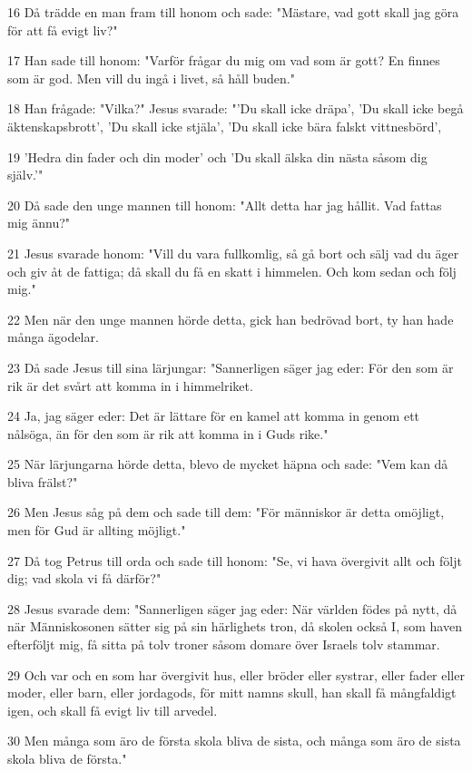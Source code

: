 \par 16 Då trädde en man fram till honom och sade: "Mästare, vad gott skall jag göra för att få evigt liv?"
\par 17 Han sade till honom: "Varför frågar du mig om vad som är gott? En finnes som är god. Men vill du ingå i livet, så håll buden."
\par 18 Han frågade: "Vilka?" Jesus svarade: "'Du skall icke dräpa', 'Du skall icke begå äktenskapsbrott', 'Du skall icke stjäla', 'Du skall icke bära falskt vittnesbörd',
\par 19 'Hedra din fader och din moder' och 'Du skall älska din nästa såsom dig själv.'"
\par 20 Då sade den unge mannen till honom: "Allt detta har jag hållit. Vad fattas mig ännu?"
\par 21 Jesus svarade honom: "Vill du vara fullkomlig, så gå bort och sälj vad du äger och giv åt de fattiga; då skall du få en skatt i himmelen. Och kom sedan och följ mig."
\par 22 Men när den unge mannen hörde detta, gick han bedrövad bort, ty han hade många ägodelar.
\par 23 Då sade Jesus till sina lärjungar: "Sannerligen säger jag eder: För den som är rik är det svårt att komma in i himmelriket.
\par 24 Ja, jag säger eder: Det är lättare för en kamel att komma in genom ett nålsöga, än för den som är rik att komma in i Guds rike."
\par 25 När lärjungarna hörde detta, blevo de mycket häpna och sade: "Vem kan då bliva frälst?"
\par 26 Men Jesus såg på dem och sade till dem: "För människor är detta omöjligt, men för Gud är allting möjligt."
\par 27 Då tog Petrus till orda och sade till honom: "Se, vi hava övergivit allt och följt dig; vad skola vi få därför?"
\par 28 Jesus svarade dem: "Sannerligen säger jag eder: När världen födes på nytt, då när Människosonen sätter sig på sin härlighets tron, då skolen också I, som haven efterföljt mig, få sitta på tolv troner såsom domare över Israels tolv stammar.
\par 29 Och var och en som har övergivit hus, eller bröder eller systrar, eller fader eller moder, eller barn, eller jordagods, för mitt namns skull, han skall få mångfaldigt igen, och skall få evigt liv till arvedel.
\par 30 Men många som äro de första skola bliva de sista, och många som äro de sista skola bliva de första."

